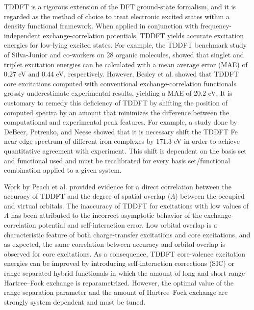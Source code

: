 \documentclass{article}
\begin{document}
TDDFT is a rigorous extension of the DFT ground-state formalism,\cite{runge_density-functional_1984} and it is regarded as the method of choice to treat electronic excited states within a density functional framework.
 When applied in conjunction with frequency-independent exchange-correlation potentials, TDDFT yields accurate excitation energies for low-lying excited states. For example, the TDDFT benchmark study of Silva-Junior and co-workers\cite{silva-junior_benchmarks_2008} on 28 organic molecules, showed that singlet and triplet excitation energies can be calculated with a mean average error (MAE) of 0.27 eV and 0.44 eV, respectively. However, Besley et al.\cite{besley_self-consistent-field_2009} showed that TDDFT core excitations computed with conventional exchange-correlation functionals grossly underestimate experimental results, yielding a MAE of 20.2 eV. It is customary to remedy this deficiency of TDDFT by shifting the position of computed spectra by an amount that minimizes the difference between the computational and experimental peak features. For example, a study done by DeBeer, Petrenko, and Neese\cite{debeer_george_prediction_2008} showed that it is necessary shift the TDDFT Fe near-edge spectrum of different iron complexes by 171.3 eV in order to achieve quantitative agreement with experiment. This shift is dependent on the basis set and functional used and must be recalibrated for every basis set/functional combination applied to a given system.

Work by Peach et al.\cite{peach_excitation_2008} provided evidence for a direct correlation between the accuracy of TDDFT and the degree of spatial overlap ($\Lambda$) between the occupied and virtual orbitals.
The inaccuracy of TDDFT for excitations with low values of $\Lambda$ has been attributed to the incorrect asymptotic behavior of the exchange-correlation potential and self-interaction error.\cite{peach_excitation_2008} Low orbital overlap is a characteristic feature of both charge-transfer excitations and core excitations, and as expected, the same correlation between accuracy and orbital overlap is observed for core excitations.\cite{besley_time-dependent_2009}
As a consequence, TDDFT core-valence excitation energies can be improved by introducing self-interaction corrections (SIC)\cite{tu_core_2007} or range separated hybrid functionals in which the amount of long and short range Hartree--Fock exchange is reparametrized.\cite{besley_time-dependent_2009, nakata_time-dependent_2006}  However, the optimal value of the range separation parameter and the amount of Hartree--Fock exchange are strongly system dependent and must be tuned.\cite{capano_role_2013,besley_time-dependent_2007,besley_time-dependent_2010}
\end{document}
